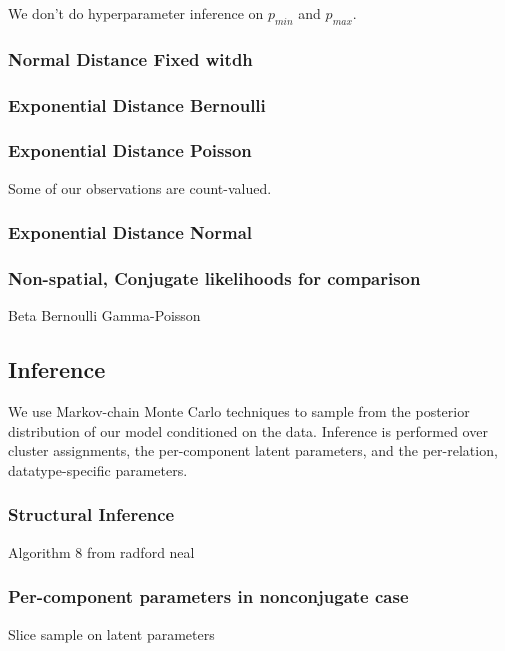 \documentclass{article}
\begin{document}
We don't do hyperparameter inference on $p_{min}$ and $p_{max}$. 

\subsubsection{Normal Distance Fixed witdh}

\subsubsection{Exponential Distance Bernoulli}


\subsubsection{Exponential Distance Poisson}
Some of our observations are count-valued. 


\subsubsection{Exponential Distance Normal}


\subsubsection{Non-spatial, Conjugate likelihoods for comparison}
Beta Bernoulli
Gamma-Poisson

\subsection{Inference}

We use Markov-chain Monte Carlo techniques to sample from the posterior 
distribution of our model conditioned on the data. Inference is
performed over cluster assignments, the per-component latent parameters, 
and the per-relation, datatype-specific parameters. 


\subsubsection{Structural Inference}
Algorithm 8 from radford neal \cite{nealalgo8}

\subsubsection{Per-component parameters in nonconjugate case}
Slice sample on latent parameters
\end{document}
